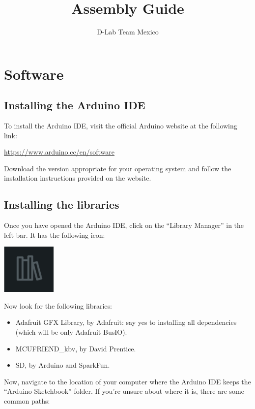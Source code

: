 \documentclass{article}
\title{Assembly Guide}
\author{D-Lab Team Mexico}
\begin{document}
\maketitle

\section{Software}
\subsection{Installing the Arduino IDE}
To install the Arduino IDE, visit the official Arduino website at the following link:

\href{https://www.arduino.cc/en/software}{https://www.arduino.cc/en/software}

\noindent
Download the version appropriate for your operating system and follow the installation instructions provided on the website.

\subsection{Installing the libraries}


Once you have opened the Arduino IDE, click on the ``Library Manager'' in the left bar. It has the following icon:

\vspace{1em}
\begin{center}
    \includegraphics[width=0.2\textwidth]{../images/library_manager.png}
\end{center}

Now look for the following libraries:

\begin{itemize}
    \item Adafruit GFX Library, by Adafruit: say yes to installing all dependencies (which will be only Adafruit BusIO).
    \item MCUFRIEND\_kbv, by David Prentice.
    \item SD, by Arduino and SparkFun.
\end{itemize}

\noindent
Now, navigate to the location of your computer where the Arduino IDE keeps the ``Arduino Sketchbook'' folder. If you're unsure about where it is, there are some common paths:
\end{document}
